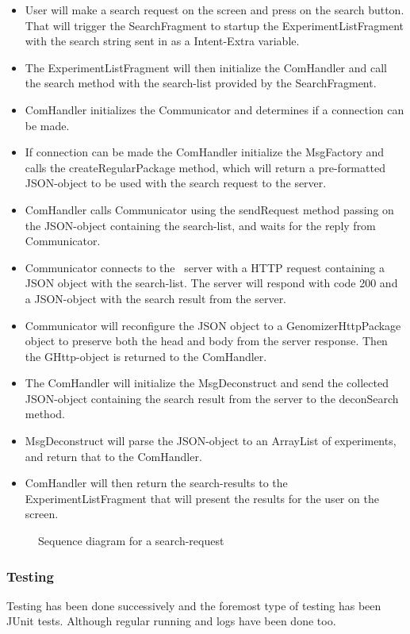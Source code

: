	\begin{itemize}
		\item
			User will make a search request on the screen and press on the search button. That will trigger the SearchFragment to startup the ExperimentListFragment with the search string sent in as a Intent-Extra variable.
		\item
			The ExperimentListFragment will then initialize the ComHandler and call the search method with the search-list provided by the SearchFragment.
		\item
			ComHandler initializes the Communicator and determines if a connection can be made.
		\item
			If connection can be made the ComHandler initialize the MsgFactory and calls the createRegularPackage method, which will return a pre-formatted JSON-object to be used with the search request to the server.
		\item
			ComHandler calls Communicator using the sendRequest method passing on the JSON-object containing the search-list, and waits for the reply from Communicator.
		\item
			Communicator connects to the \appName\ server with a HTTP request containing a JSON object with the search-list. The server will respond with code 200 and a JSON-object with the search result from the server.
		\item
			Communicator will reconfigure the JSON object to a GenomizerHttpPackage object to preserve both the head and body from the server response. Then the GHttp-object is returned to the ComHandler.
		\item
			The ComHandler will initialize the MsgDeconstruct and send the collected JSON-object containing the search result from the server to the deconSearch method.
		\item
			MsgDeconstruct will parse the JSON-object to an ArrayList of experiments, and return that to the ComHandler.
		\item
			ComHandler will then return the search-results to the ExperimentListFragment that will present the results for the user on the screen.
	\end{itemize} 

	\begin{figure}
		\caption{Sequence diagram for a search-request}
		\label{fig:and_searchseq}
	\end{figure}
\subsubsection{Testing}
Testing has been done successively and the foremost type of testing has been JUnit tests. Although regular running and logs have been done too.


